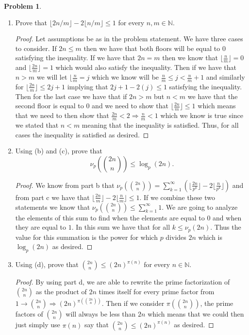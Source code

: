 \documentclass[11pt, letter]{amsart}
\theoremstyle{definition}
\newtheorem{problem}{Problem}[]
\begin{document}
\begin{problem}
\begin{enumerate}[label={(\alph*)}]
\begin{proof}
    \end{proof}
  \item Prove that $\lfloor 2n / m\rfloor - 2\lfloor n / m\rfloor \leq 1$ for every $n, m \in \mathbb N$.
  \begin{proof}
      Let assumptions be as in the problem statement. We have three cases to consider. If $2n \leq m$ then we have that both floors will be equal to $0$ satisfying the inequality. If we have that $2n = m$ then we know that $\lfloor \frac{n}{m}\rfloor = 0$ and $\lfloor\frac{2n}{m}\rfloor = 1$ which would also satisfy the inequality. Then if we have that $n > m$ we will let $\lfloor \frac{n}{m} = j$ which we know will be $\frac{n}{m} \leq j < \frac{n}{m} + 1$ and similarly for $\lfloor\frac{2n}{m}\rfloor \leq 2j + 1$ implying that $2j + 1 - 2(j) \leq 1$ satisfying the inequality. Then for the last case we have that if $2n > m$ but $n < m$ we have that the second floor is equal to $0$ and we need to show that $\lfloor\frac{2n}{m}\rfloor \leq 1$ which means that we need to then show that $\frac{2n}{m} < 2 \Rightarrow \frac{n}{m} < 1$ which we know is true since we stated that $n < m$ meaning that the inequality is satisfied. Thus, for all cases the inequality is satisfied as desired.
  \end{proof}
  \item Using (b) and (c), prove that
    \begin{equation*}
      \nu_p\left(\binom{2n}{n}\right) \leq \log_p(2n).
    \end{equation*}
    \begin{proof}
        We know from part b that $\nu_p(\binom{2n}{n}) = \sum_{k = 1}^\infty(\lfloor\frac{2n}{p^k}\rfloor - 2\lfloor\frac{n}{p^k}\rfloor)$ and from part c we have that $\lfloor\frac{2n}{m}\rfloor - 2\lfloor\frac{n}{m}\rfloor \leq 1.$ If we combine these two statements we know that $\nu_p(\binom{2n}{n}) \leq \sum_{k = 1}^\infty 1$. We are going to analyze the elements of this sum to find when the elements are equal to $0$ and when they are equal to $1$. In this sum we have that for all $k \leq \nu_p(2n)$. Thus the value for this summation is the power for which $p$ divides $2n$ which is $\log_p(2n)$ as desired.
    \end{proof}
  \item Using (d), prove that $\binom{2n}{n} \leq (2n)^{\pi(n)}$ for every $n \in \mathbb N$.
  \begin{proof}
      By using part d, we are able to rewrite the prime factorization of $\binom{2n}{n}$ as the product of $2n$ times itself for every prime factor from $1 \to \binom{2n}{n} \Rightarrow (2n)^{\pi(\binom{2n}{n})}$. Then if we consider $\pi(\binom{2n}{n})$, the prime factors of $\binom{2n}{n}$ will always be less than $2n$ which means that we could then just simply use $\pi(n)$ say that $\binom{2n}{n} \leq (2n)^{\pi(n)}$ as desired.

\end{proof}
\end{enumerate}
\end{problem}
\end{document}
